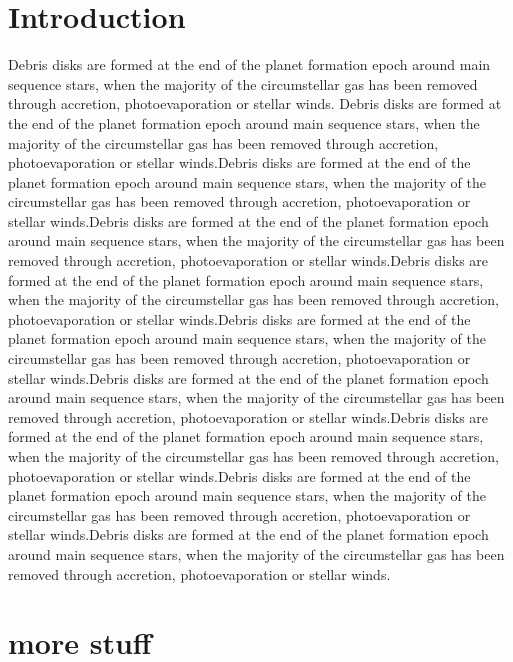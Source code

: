 \documentclass{aa}
\begin{document}
   \section{Introduction}

Debris disks are formed at the end of the planet formation epoch around main sequence stars, when the majority of the circumstellar gas has been removed through accretion, photoevaporation or stellar winds.
%
Debris disks are formed at the end of the planet formation epoch around main sequence stars, when the majority of the circumstellar gas has been removed through accretion, photoevaporation or stellar winds.Debris disks are formed at the end of the planet formation epoch around main sequence stars, when the majority of the circumstellar gas has been removed through accretion, photoevaporation or stellar winds.Debris disks are formed at the end of the planet formation epoch around main sequence stars, when the majority of the circumstellar gas has been removed through accretion, photoevaporation or stellar winds.Debris disks are formed at the end of the planet formation epoch around main sequence stars, when the majority of the circumstellar gas has been removed through accretion, photoevaporation or stellar winds.Debris disks are formed at the end of the planet formation epoch around main sequence stars, when the majority of the circumstellar gas has been removed through accretion, photoevaporation or stellar winds.Debris disks are formed at the end of the planet formation epoch around main sequence stars, when the majority of the circumstellar gas has been removed through accretion, photoevaporation or stellar winds.Debris disks are formed at the end of the planet formation epoch around main sequence stars, when the majority of the circumstellar gas has been removed through accretion, photoevaporation or stellar winds.Debris disks are formed at the end of the planet formation epoch around main sequence stars, when the majority of the circumstellar gas has been removed through accretion, photoevaporation or stellar winds.Debris disks are formed at the end of the planet formation epoch around main sequence stars, when the majority of the circumstellar gas has been removed through accretion, photoevaporation or stellar winds.

   \section{more stuff}

\end{document}
